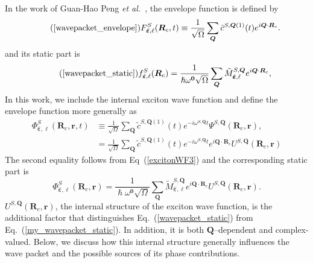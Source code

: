In the work of Guan-Hao Peng \textit{et al.}~\cite{peng2022tailoring}, the envelope function is defined by
\begin{equation}
\tag{\ref{wavepacket_envelope}} %
F^{S}_{\hat{\boldsymbol{\varepsilon}}, \ell}(\boldsymbol{R}_c,t)
\equiv
\frac{1}{\sqrt{\Omega}}
\sum_{\boldsymbol{Q}}
\tilde{c}^{S,\boldsymbol{Q}(1)}(t)
e^{i\boldsymbol{Q}\cdot\boldsymbol{R}_c}.
\end{equation}
and its static part is
\begin{equation}
\tag{\ref{wavepacket_static}}
f^{S}_{\hat{\boldsymbol{\varepsilon}}, \ell}(\boldsymbol{R}_c)
=
\frac{1}{\hslash \omega^{\boldsymbol{0}} \sqrt{\Omega}}
\sum_{\boldsymbol{Q}}
\tilde{M}_{\hat{\boldsymbol{\varepsilon}}, \ell}^{S,\boldsymbol{Q}}
e^{i\boldsymbol{Q}\cdot\boldsymbol{R}_c},
\end{equation}
In this work, we include the internal exciton wave function and define the envelope function more generally as
\begin{equation}
\begin{aligned}
\Phi^{S}_{\hat{\boldsymbol{\varepsilon}}, \ell}(\boldsymbol{R}_c, \boldsymbol{r}, t)
&\equiv
\frac{1}{\sqrt{\Omega}}
\sum_{\boldsymbol{Q}}
\tilde{c}^{S,\boldsymbol{Q}(1)}(t)
e^{-i\omega^{S,\boldsymbol{Q}} t}
\Psi^{S,\boldsymbol{Q}}(\boldsymbol{R}_c,\boldsymbol{r}), \\
&=
\frac{1}{\sqrt{\Omega}}
\sum_{\boldsymbol{Q}}
\tilde{c}^{S,\boldsymbol{Q}(1)}(t)
e^{-i\omega^{S,\boldsymbol{Q}} t}
e^{i\boldsymbol{Q}\cdot\boldsymbol{R}_c}U^{S,\boldsymbol{Q}} (\boldsymbol{R}_c,\boldsymbol{r})
\end{aligned}
\end{equation}
The second equality follows from Eq~(\ref{excitonWF3}) and the corresponding static part is
\begin{equation}
\Phi^{S}_{\hat{\boldsymbol{\varepsilon}}, \ell}(\boldsymbol{R}_c, \boldsymbol{r})
=
\frac{1}{\hslash \omega^{\boldsymbol{0}} \sqrt{\Omega}}
\sum_{\boldsymbol{Q}}
\tilde{M}_{\hat{\boldsymbol{\varepsilon}}, \ell}^{S,\boldsymbol{Q}}
e^{i\boldsymbol{Q}\cdot\boldsymbol{R}_c} U^{S,\boldsymbol{Q}}(\boldsymbol{R}_c,\boldsymbol{r}).
\label{my_wavepacket_static}
\end{equation}
$U^{S,\boldsymbol{Q}}(\boldsymbol{R}_c,\boldsymbol r)$, the internal structure of the exciton wave function, is the additional factor that distinguishes Eq.~(\ref{wavepacket_static}) from Eq.~(\ref{my_wavepacket_static}). In addition, it is both $\boldsymbol{Q}$--dependent and complex-valued. Below, we discuss how this internal structure generally influences the wave packet and the possible sources of its phase contributions.

